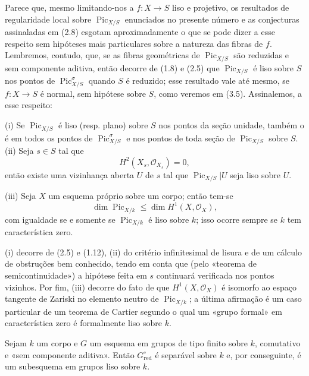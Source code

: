 Parece que, mesmo limitando-nos a $f:X\longrightarrow S$ liso e projetivo, os
resultados de regularidade local sobre $\operatorname{Pic}_{X/S}$ enunciados no
presente número e as conjecturas assinaladas em (2.8) esgotam aproximadamente o
que se pode dizer a esse respeito sem hipóteses mais particulares sobre a
natureza das fibras de $f$. Lembremos, contudo, que, se as fibras geométricas
de $\operatorname{Pic}_{X/S}$ são reduzidas e sem componente aditiva, então
decorre de (1.8) e (2.5) que $\operatorname{Pic}_{X/S}$ é liso sobre $S$ nos
pontos de $\operatorname{Pic}_{X/S}^\sigma$ quando $S$ é reduzido; esse
resultado vale até mesmo, se $f:X\longrightarrow S$ é normal, sem hipótese
sobre $S$, como veremos em (3.5). Assinalemos, a esse respeito:


\noindent(i) Se $\operatorname{Pic}_{X/S}$ é liso (resp. plano) sobre $S$ nos
pontos da seção unidade, também o é em todos os pontos de
$\operatorname{Pic}_{X/S}^\sigma$ e nos pontos de toda seção de
$\operatorname{Pic}_{X/S}$ sobre $S$.
\noindent(ii) Seja $s\in S$ tal que
\[
H^2(X_s,\mathcal O_{X_s})=0,
\]
então existe uma vizinhança aberta $U$ de $s$ tal que
$\operatorname{Pic}_{X/S}|U$ seja liso sobre $U$.

\noindent(iii) Seja $X$ um esquema próprio sobre um corpo; então tem-se
\[
\dim\operatorname{Pic}_{X/k}\leq\dim H^1(X,\mathcal O_X),
\]
com igualdade se e somente se $\operatorname{Pic}_{X/k}$ é liso sobre $k$;
isso ocorre sempre se $k$ tem característica zero.

(i) decorre de (2.5) e (1.12), (ii) do critério infinitesimal de lisura e de um
cálculo de obstruções bem conhecido, tendo em conta que (pelo «teorema de
semicontinuidade») a hipótese feita em $s$ continuará verificada nos pontos
vizinhos. Por fim, (iii) decorre do fato de que $H^1(X,\mathcal O_X)$ é
isomorfo ao espaço tangente de Zariski no elemento neutro de
$\operatorname{Pic}_{X/k}$; a última afirmação é um caso particular de um
teorema de Cartier segundo o qual um «grupo formal» em característica zero é
formalmente liso sobre $k$.


 Sejam $k$ um corpo e $G$ um esquema em grupos de tipo
finito sobre $k$, comutativo e «sem componente aditiva». Então
$G_{\mathrm{red}}^\circ$ é separável sobre $k$ e, por conseguinte, é um
subesquema em grupos liso sobre $k$.

